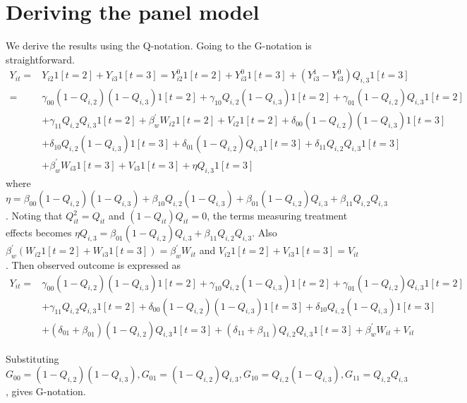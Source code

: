 \documentclass[12pt]{article}
\begin{document}
\section{Deriving the panel model} \label{appendix:panel:form}
We derive the results using the Q-notation. Going to the G-notation is straightforward.
\begin{equation*}
	\begin{split}
		Y_{it} = & Y_{i2} 1[t=2]+ Y_{i3} 1[t=3] = Y_{i2}^0 1[t=2]+ Y_{i3}^0 1[t=3] + (Y_{i3}^1-Y_{i3}^0)Q_{i,3}1[t=3] \\
			= & \gamma_{00}(1-Q_{i,2})(1-Q_{i,3})1[t=2] + \gamma_{10}Q_{i,2}(1-Q_{i,3})1[t=2] + \gamma_{01}(1-Q_{i,2})Q_{i,3}1[t=2]\\
				&   + \gamma_{11}Q_{i,2}Q_{i,3}1[t=2]  + \beta_w^\prime W_{i2}1[t=2] + V_{i2}1[t=2] + \delta_{00}(1-Q_{i,2})(1-Q_{i,3})1[t=3]\\
				&  + \delta_{10}Q_{i,2}(1-Q_{i,3})1[t=3]  + \delta_{01}(1-Q_{i,2})Q_{i,3}1[t=3] + \delta_{11}Q_{i,2}Q_{i,3}1[t=3]\\
				& + \beta_w^\prime W_{i3}1[t=3] + V_{i3}1[t=3] + \eta Q_{i,3} 1[t=3]
\end{split}
\end{equation*}
where $\eta = \beta_{00}(1-Q_{i,2})(1-Q_{i,3}) + \beta_{10}Q_{i,2}(1-Q_{i,3}) + \beta_{01}(1-Q_{i,2})Q_{i,3}  + \beta_{11}Q_{i,2}Q_{i,3}$. Noting that $Q_{it}^2=Q_{it}$ and $(1-Q_{it})Q_{it}=0$, the terms measuring treatment effects becomes $\eta Q_{i,3} = \beta_{01}(1-Q_{i,2})Q_{i,3}  + \beta_{11}Q_{i,2}Q_{i,3}$. Also $\beta_w^\prime (W_{i2}1[t=2]+ W_{i3}1[t=3]) = \beta_w^\prime W_{it}$ and $V_{i2}1[t=2] +V_{i3}1[t=3] = V_{it}$. Then observed outcome is expressed as 
\begin{align*}
Y_{it} = & \gamma_{00}(1-Q_{i,2})(1-Q_{i,3})1[t=2] + \gamma_{10}Q_{i,2}(1-Q_{i,3})1[t=2] + \gamma_{01}(1-Q_{i,2})Q_{i,3}1[t=2] \\
& + \gamma_{11}Q_{i,2}Q_{i,3}1[t=2] + \delta_{00}(1-Q_{i,2})(1-Q_{i,3})1[t=3] + \delta_{10}Q_{i,2}(1-Q_{i,3})1[t=3] \\ 
& + (\delta_{01}+\beta_{01})(1-Q_{i,2})Q_{i,3}1[t=3] + (\delta_{11}+\beta_{11})Q_{i,2}Q_{i,3}1[t=3] + \beta_w^\prime W_{it} + V_{it}
\end{align*}

Substituting $G_{00}=(1-Q_{i,2})(1-Q_{i,3}), G_{01}=(1-Q_{i,2})Q_{i,3}, G_{10}=Q_{i,2}(1-Q_{i,3}), G_{11}=Q_{i,2}Q_{i,3}$, gives G-notation.
\end{document}
